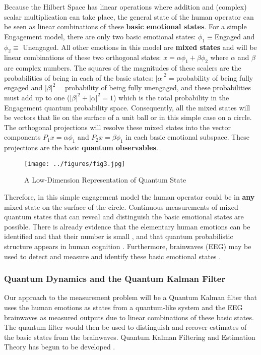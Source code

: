 Because the Hilbert Space has linear operations where addition and (complex) scalar multiplication can take place, the general state of the human operator can be seen as linear combinations of these \textbf{basic emotional states}. For a simple Engagement model, there are only two basic emotional states: $\phi_1\equiv $Engaged and $\phi_2\equiv$ Unengaged. All other emotions in this model are \textbf{mixed states} and will be linear combinations of these two orthogonal states: $x=\alpha \phi_1+\beta \phi_2$ where $\alpha$ and $\beta$ are complex numbers. The squares of the magnitudes of these scalers are the probabilities of being in each of the basic states: $|\alpha|^2=$probability of being fully engaged and $|\beta|^2=$probability of being fully unengaged, and these probabilities must add up to one ($|\beta|^2+|\alpha|^2=1$) which is the total probability in the Engagement  quantum probability space. Consequently, all the mixed states will be vectors that lie on the surface of a unit ball or in this simple case on a circle. The orthogonal projections will resolve these mixed states into the vector components $P_1x=\alpha \phi_1$ and $P_2x=\beta \phi_1$ in each basic emotional subspace. These projections are the basic \textbf{quantum observables}.
	\begin{figure}[h]
    \centering
    \texttt{[image: ../figures/fig3.jpg]}  
    \caption{A Low-Dimension Representation of Quantum State}
    \end{figure}
Therefore, in this simple engagement model the human operator could be in \textbf{any} mixed state on the surface of the circle. Continuous measurements of mixed quantum states that can reveal and distinguish the basic emotional states are possible. There is already evidence that the elementary human emotions can be identified and that their number is small \cite{Ekman1992,Celeghin2017}, and that quantum probabilistic structure appears in human cognition \cite{Aerts2011}. Furthermore, brainwaves (EEG) may be used to detect and measure and identify these basic emotional states \cite{Heraz2007,Deng2010,Basar1999}.

\subsubsection{Quantum Dynamics and the Quantum Kalman Filter}
Our approach to the measurement problem will be a Quantum Kalman filter that uses the human emotions as states from a quantum-like system and the EEG brainwaves as measured outputs due to linear combinations of these basic states. The quantum filter would then be used to distinguish and recover estimates of the basic states from the brainwaves. Quantum Kalman Filtering and Estimation Theory has begun to be developed \cite{Accardi2003,Bouten2009}.\\

